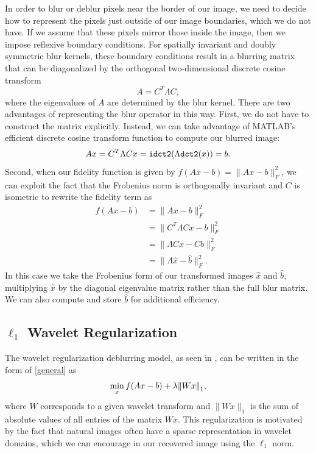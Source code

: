 \documentclass[10pt,a4paper]{article}
\begin{document}
	In order to blur or deblur pixels near the border of our image, we need to decide how to represent the pixels just outside of our image boundaries, which we do not have. If we assume that these pixels mirror those inside the image, then we impose reflexive boundary conditions. For spatially invariant and doubly symmetric blur kernels, these boundary conditions result in a blurring matrix that can be diagonalized by the orthogonal two-dimensional discrete cosine transform
	\begin{equation}
	A = C^T \Lambda C,
	\end{equation}
	where the eigenvalues of $A$ are determined by the blur kernel. There are two advantages of representing the blur operator in this way. First, we do not have to construct the matrix explicitly. Instead, we can take advantage of MATLAB's efficient discrete cosine transform function to compute our blurred image:
	\begin{equation}
	Ax = C^T \Lambda C x = {\tt idct2}( \Lambda {\tt dct2}(x)) = b.
	\end{equation}
	Second, when our fidelity function is given by $f(Ax -b) = \| Ax - b \|_F^2$, we can exploit the fact that the Frobenius norm is orthogonally invariant and $C$ is isometric to rewrite the fidelity term as
	\begin{align*}
	f(Ax - b) &= \| Ax - b \|_F^2 \\
	&= \| C^T \Lambda C x - b \|_F^2 \\
	&= \| \Lambda Cx - Cb \|_F^2 \\
	&= \| \Lambda \hat{x} - \hat{b} \|_F^2.
	\end{align*}
	In this case we take the Frobenius form of our transformed images $\hat x$ and $\hat b$, multiplying $\hat x$ by the diagonal eigenvalue matrix rather than the full blur matrix. We can also compute and store $\hat b$ for additional efficiency. 
	
	\subsection{$\ell_1$ Wavelet Regularization}
	
	The wavelet regularization deblurring model, as seen in \cite{FISTA}, can be written in the form of \eqref{general} as 
	\begin{equation} \label{wavelet_orig}
	\min_{x} f(Ax-b) + \lambda \norm{Wx}_1 ,
	\end{equation}
	where $W$ corresponds to a given wavelet transform and $\|Wx\|_1$ is the sum of absolute values of all entries of the matrix $Wx$. This regularization is motivated by the fact that natural images often have a sparse representation in wavelet domains, which we can encourage in our recovered image using the $\ell_1$ norm. 
	
\end{document}
